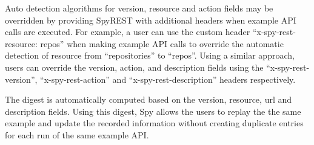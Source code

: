 \documentclass[conference]{IEEEtran}
\begin{document}
Auto detection algorithms for version, resource and action fields may be overridden by providing SpyREST with additional headers when example API calls are executed. For example, a user can use the custom header ``x-spy-rest-resource: repos'' when making example API calls to override the automatic detection of resource from ``repositories'' to ``repos''. Using a similar approach, users can override the version, action, and description fields using the ``x-spy-rest-version'', ``x-spy-rest-action'' and ``x-spy-rest-description'' headers respectively.

The digest is automatically computed based on the version, resource, url and description fields. Using this digest, Spy allows the users to replay the the same example and update the recorded information without creating duplicate entries for each run of the same example API.
\end{document}
